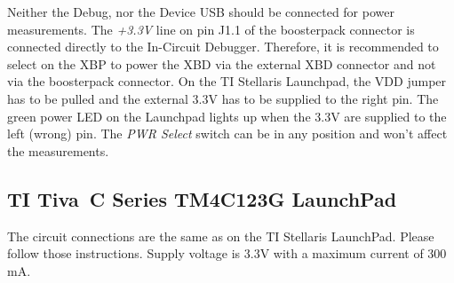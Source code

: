 \documentclass[twoside,11pt]{cergdoc}
\begin{document}
Neither the Debug, nor the Device USB should be connected for power measurements.
The \emph{+3.3V} line on pin J1.1 of the boosterpack connector is connected 
directly to the In-Circuit Debugger. Therefore, it is recommended to select on the
XBP to power the XBD via the external XBD connector and not via the boosterpack
connector. On the TI Stellaris Launchpad, the VDD jumper has to be pulled and the
external 3.3V has to be supplied to the right pin. The green power LED on the
Launchpad lights up when the 3.3V are supplied to the left (wrong) pin. 
The \emph{PWR Select} switch can be in any position and won't affect the 
measurements.

\subsection{TI Tiva\texttrademark~C Series TM4C123G LaunchPad}

The circuit connections are the same as on the TI Stellaris LaunchPad. Please follow
those instructions. Supply voltage is 3.3V with a maximum current of 300\,mA.
\end{document}
